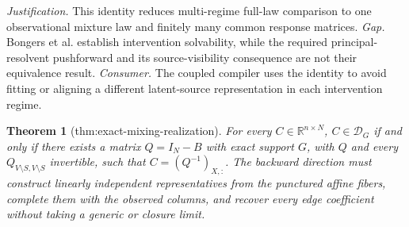 \documentclass{article}
\newtheorem{theorem}{Theorem}
\begin{document}
\par\smallskip\noindent \textit{Justification.} This identity reduces multi-regime full-law comparison to one observational mixture law and finitely many common response matrices. \textit{Gap.} Bongers et al. establish intervention solvability, while the required principal-resolvent pushforward and its source-visibility consequence are not their equivalence result. \textit{Consumer.} The coupled compiler uses the identity to avoid fitting or aligning a different latent-source representation in each intervention regime.

\begin{theorem}[thm:exact-mixing-realization]\label{thm:exact-mixing-realization}
For every \(C\in\mathbb R^{n\times N}\), \(C\in\mathcal D_G\) if and only if there exists a matrix \(Q=I_N-B\) with exact support \(G\), with \(Q\) and every \(Q_{V\setminus S,V\setminus S}\) invertible, such that \(C=(Q^{-1})_{X,:}\). The backward direction must construct linearly independent representatives from the punctured affine fibers, complete them with the observed columns, and recover every edge coefficient without taking a generic or closure limit.
\end{theorem}
\end{document}
